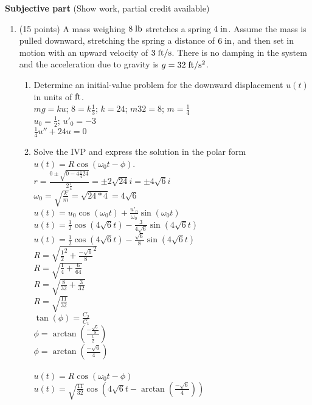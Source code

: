 \documentclass{article}
\begin{document}
\bigskip\bigskip\noindent
{\bf Subjective part} (Show work, partial credit available)

\begin{enumerate}

\item (15 points)  A mass weighing $8\;{\rm lb}$ stretches a spring $4\;{\rm in}$.  Assume the mass is pulled downward, stretching the spring a distance of $6\;{\rm in}$, and then set in motion with an upward velocity of $3\;{\rm ft}/{\rm s}$.  There is no damping in the system and the acceleration due to gravity is $g=32\;{\rm ft}/{\rm s}\sp2$.
\begin{enumerate}
\item
Determine an initial-value problem for the downward displacement $u(t)$ in units of ${\rm ft}$.
\\$mg=ku$; $8=k\frac{1}{3}$; $k=24$; $m32=8$; $m=\frac{1}{4}$
\\$u_0=\frac{1}{2}$; $u'_0=-3$
\\$\frac{1}{4}u''+24u=0$

\item
Solve the IVP and express the solution in the polar form $u(t)=R\cos(\omega_0t-\phi)$.
\\$r=\frac{0\pm\sqrt{0-4\frac{1}{4}24}}{2\frac{1}{4}}=\pm2\sqrt{24}i=\pm4\sqrt{6}i$
\\$\omega_0=\sqrt{\frac{k}{m}}=\sqrt{24*4}=4\sqrt{6}$
\\$u(t)=u_0\cos(\omega_0t)+\frac{u'_0}{\omega_0}\sin(\omega_0t)$
\\$u(t)=\frac{1}{2}\cos(4\sqrt{6}t)-\frac{3}{4\sqrt{6}}\sin(4\sqrt{6}t)$
\\$u(t)=\frac{1}{2}\cos(4\sqrt{6}t)-\frac{\sqrt{6}}{8}\sin(4\sqrt{6}t)$
\\$R=\sqrt{\frac{1}{2}^2+\frac{-\sqrt{6}}{8}^2}$
\\$R=\sqrt{\frac{1}{4}+\frac{6}{64}}$
\\$R=\sqrt{\frac{8}{32}+\frac{3}{32}}$
\\$R=\sqrt{\frac{11}{32}}$
\\$\tan(\phi)=\frac{C_2}{C_1}$
\\$\phi=\arctan(\frac{-\frac{\sqrt{6}}{8}}{\frac{1}{2}})$
\\$\phi=\arctan(\frac{-\sqrt{6}}{4})$
\\
\\$u(t)=R\cos(\omega_0t-\phi)$
\\$u(t)=\sqrt{\frac{11}{32}}\cos(4\sqrt{6}t-\arctan(\frac{-\sqrt{6}}{4}))$
\\


\end{enumerate}
\end{enumerate}
\end{document}
